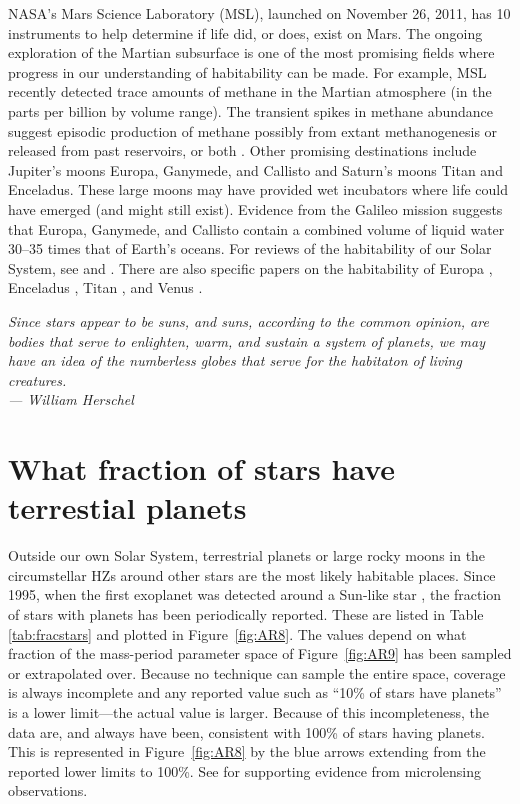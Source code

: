 NASA's Mars Science Laboratory (MSL), launched on November 26, 2011, has 10 instruments to help determine if life did, or does, exist on Mars. The ongoing exploration of the Martian subsurface is one of the most promising fields where progress in our understanding of habitability can be made. For example, MSL recently detected trace amounts of methane in the Martian atmosphere (in the parts per billion by volume range). The transient spikes in methane abundance suggest episodic production of methane possibly from extant methanogenesis or released from past reservoirs, or both \cite{Webster2015}. Other promising destinations include Jupiter's moons Europa, Ganymede, and Callisto and Saturn's moons Titan and Enceladus. These large moons may have provided wet incubators where life could have emerged (and might still exist). Evidence from the Galileo mission \citep{Spohn2003} suggests that Europa, Ganymede, and Callisto contain a combined volume of liquid water 30–35 times that of Earth's oceans. For reviews of the habitability of our Solar System, see \citet{Shapiro2009} and \citet{McKay2011}. There are also specific papers on the habitability of Europa \citep{Chyba2001,Hand2007}, Enceladus \citep{McKay2008}, Titan \citep{Benner2004,McKay2005,Raulin2008}, and Venus \citep{Grinspoon1997,Svedhem2007}.

\clearpage

\begin{flushright}
	\textit{Since stars appear to be suns, and suns, according to the common opinion, are bodies that serve to enlighten, warm, and sustain a system of planets, we may have an idea of the numberless globes that serve for the habitaton of living creatures.\\
		--- William Herschel}
\end{flushright}

\section{What fraction of stars have terrestial planets}\label{sec:FractionPlanets}

Outside our own Solar System, terrestrial planets or large rocky moons in the circumstellar HZs around other stars are the most likely habitable places. Since 1995, when the first exoplanet was detected around a Sun-like star \citep{Mayor1995}, the fraction of stars with planets has been periodically reported. These are listed in Table \ref{tab:fracstars} and plotted in Figure~\ref{fig:AR8}. The values depend on what fraction of the mass-period parameter space of Figure~\ref{fig:AR9} has been sampled or extrapolated over. Because no technique can sample the entire space, coverage is always incomplete and any reported value such as ``10\% of stars have planets'' is a lower limit—the actual value is larger. Because of this incompleteness, the data are, and always have been, consistent with 100\% of stars having planets. This is represented in Figure~\ref{fig:AR8} by the blue arrows extending from the reported lower limits to 100\%. See \citet{Cassan2012} for supporting evidence from microlensing observations.


